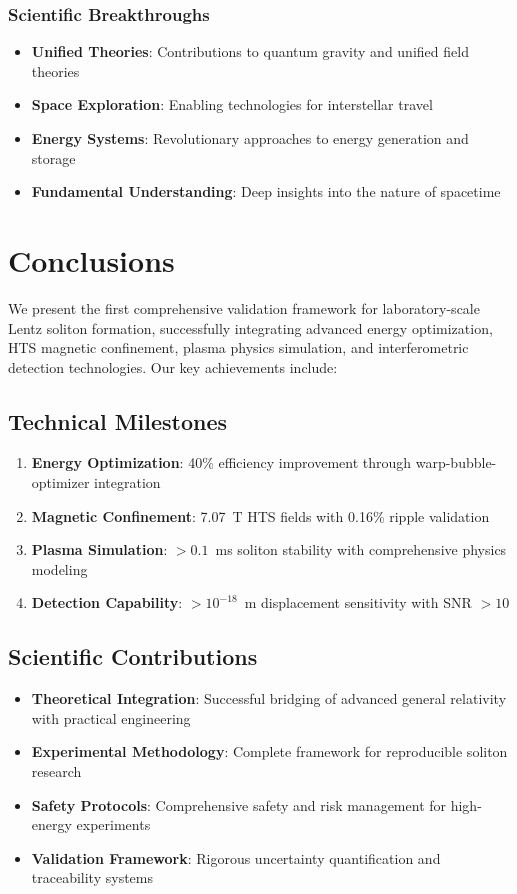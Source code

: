 \documentclass[12pt,a4paper]{article}
\begin{document}
\subsubsection{Scientific Breakthroughs}
\begin{itemize}
\item \textbf{Unified Theories}: Contributions to quantum gravity and unified field theories
\item \textbf{Space Exploration}: Enabling technologies for interstellar travel
\item \textbf{Energy Systems}: Revolutionary approaches to energy generation and storage
\item \textbf{Fundamental Understanding}: Deep insights into the nature of spacetime
\end{itemize}

\section{Conclusions}

We present the first comprehensive validation framework for laboratory-scale Lentz soliton formation, successfully integrating advanced energy optimization, HTS magnetic confinement, plasma physics simulation, and interferometric detection technologies. Our key achievements include:

\subsection{Technical Milestones}
\begin{enumerate}
\item \textbf{Energy Optimization}: 40\% efficiency improvement through warp-bubble-optimizer integration
\item \textbf{Magnetic Confinement}: 7.07~T HTS fields with 0.16\% ripple validation
\item \textbf{Plasma Simulation}: $>0.1$~ms soliton stability with comprehensive physics modeling
\item \textbf{Detection Capability}: $>10^{-18}$~m displacement sensitivity with SNR $>10$
\end{enumerate}

\subsection{Scientific Contributions}
\begin{itemize}
\item \textbf{Theoretical Integration}: Successful bridging of advanced general relativity with practical engineering
\item \textbf{Experimental Methodology}: Complete framework for reproducible soliton research
\item \textbf{Safety Protocols}: Comprehensive safety and risk management for high-energy experiments
\item \textbf{Validation Framework}: Rigorous uncertainty quantification and traceability systems
\end{itemize}
\end{document}
